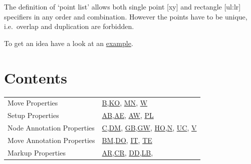 The definition of `point list' allows both single point {[}xy{]} and
rectangle {[}ul:lr{]} specifiers in any order and combination. However
the points have to be unique, i.e.~overlap and duplication are
forbidden.

To get an idea have a look at an
\href{https://red-bean.com/sgf/DD_VW.html}{example}.

\newpage

\section{Contents}\label{contents-1}

{\def\LTcaptype{none} %
\begin{longtable}[]{@{}
  >{\raggedright\arraybackslash}p{}
  >{\raggedright\arraybackslash}p{}@{}}
\toprule\noalign{}
\endhead
\bottomrule\noalign{}
\endlastfoot
Move Properties &
\href{https://red-bean.com/sgf/properties.html\#B}{B},\href{https://red-bean.com/sgf/properties.html\#KO}{KO},
\href{https://red-bean.com/sgf/properties.html\#MN}{MN},
\href{https://red-bean.com/sgf/properties.html\#W}{W} \\
Setup Properties &
\href{https://red-bean.com/sgf/properties.html\#AB}{AB},\href{https://red-bean.com/sgf/properties.html\#AE}{AE},
\href{https://red-bean.com/sgf/properties.html\#AW}{AW},
\href{https://red-bean.com/sgf/properties.html\#PL}{PL} \\
Node Annotation Properties &
\href{https://red-bean.com/sgf/properties.html\#C}{C},\href{https://red-bean.com/sgf/properties.html\#DM}{DM},
\href{https://red-bean.com/sgf/properties.html\#GB}{GB},\href{https://red-bean.com/sgf/properties.html\#GW}{GW},
\href{https://red-bean.com/sgf/properties.html\#HO}{HO},\href{https://red-bean.com/sgf/properties.html\#N}{N},
\href{https://red-bean.com/sgf/properties.html\#UC}{UC},
\href{https://red-bean.com/sgf/properties.html\#V}{V} \\
Move Annotation Properties &
\href{https://red-bean.com/sgf/properties.html\#BM}{BM},\href{https://red-bean.com/sgf/properties.html\#DO}{DO},
\href{https://red-bean.com/sgf/properties.html\#IT}{IT},
\href{https://red-bean.com/sgf/properties.html\#TE}{TE} \\
Markup Properties &
\href{https://red-bean.com/sgf/properties.html\#AR}{AR},\href{https://red-bean.com/sgf/properties.html\#CR}{CR},
\href{https://red-bean.com/sgf/properties.html\#DD}{DD},\href{https://red-bean.com/sgf/properties.html\#LB}{LB},

\end{longtable}}
